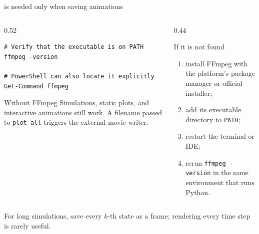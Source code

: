 \documentclass[aspectratio=169,11pt]{beamer}
\begin{document}
\begin{frame}[fragile]{ is needed only when saving animations}
\label{fr:ffmpeg}
\begin{columns}[T,onlytextwidth]
\begin{column}{0.52\textwidth}
\begin{lstlisting}
# Verify that the executable is on PATH
ffmpeg -version

# PowerShell can also locate it explicitly
Get-Command ffmpeg
\end{lstlisting}
\begin{block}{Without FFmpeg}
Simulations, static plots, and interactive animations still work. A filename passed to \texttt{plot\_all} triggers the external movie writer.
\end{block}
\end{column}
\begin{column}{0.44\textwidth}
\begin{alertblock}{If it is not found}
\begin{enumerate}\itemsep4pt
  \item install FFmpeg with the platform's package manager or official installer;
  \item add its executable directory to \texttt{PATH};
  \item restart the terminal or IDE;
  \item rerun \texttt{ffmpeg -version} in the same environment that runs Python.
\end{enumerate}
\end{alertblock}
\end{column}
\end{columns}
\begin{punchbox}
\centering
For long simulations, save every \(k\)-th state as a frame; rendering every time step is rarely useful.
\end{punchbox}
\end{frame}
\end{document}
